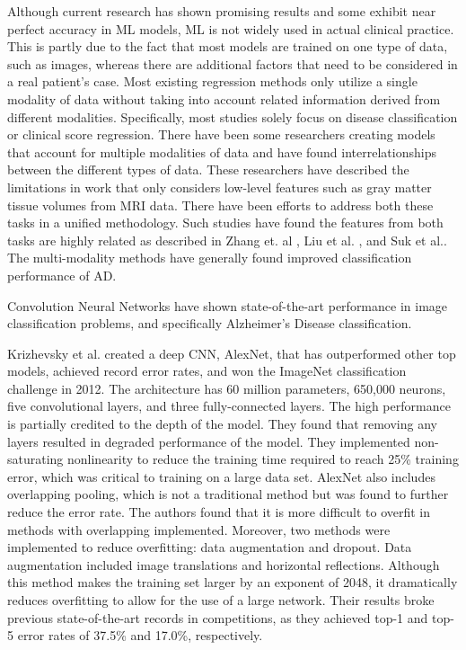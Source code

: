 \documentclass[10pt,twocolumn]{article}
\begin{document}
Although current research has shown promising results and some exhibit near perfect accuracy in ML models, ML is not widely used in actual clinical practice. This is partly due to the fact that most models are trained on one type of data, such as images, whereas there are additional factors that need to be considered in a real patient’s case. Most existing regression methods only utilize a single modality of data without taking into account related information derived from different modalities. Specifically, most studies solely focus on disease classification or clinical score regression. There have been some researchers creating models that account for multiple modalities of data and have found interrelationships between the different types of data. These researchers have described the limitations in work that only considers low-level features such as gray matter tissue volumes from MRI data. There have been efforts to address both these tasks in a unified methodology. Such studies have found the features from both tasks are highly related as described in Zhang et. al \cite{zhang2014classification}, Liu et al. \cite{liu2018joint}, and Suk et al.\cite{suk2013deep}. The multi-modality methods have generally found improved classification performance of AD. 

Convolution Neural Networks have shown state-of-the-art performance in image classification problems, and specifically Alzheimer's Disease classification. 

Krizhevsky et al.\cite{krizhevsky2012imagenet} 
created a deep CNN, AlexNet, that has outperformed other top models, achieved record error rates, and won the ImageNet classification challenge in 2012. The architecture has 60 million parameters,  650,000 neurons, five convolutional layers, and three fully-connected layers. The high performance is partially credited to the depth of the model. They found that removing any layers resulted in degraded performance of the model. They implemented non-saturating nonlinearity to reduce the training time required to reach 25\% training error, which was critical to training on a large data set.  AlexNet also includes overlapping pooling, which is not a traditional method but was found to further reduce the error rate. The authors found that it is more difficult to overfit in methods with overlapping implemented. Moreover, two methods were implemented to reduce overfitting: data augmentation and dropout. Data augmentation included image translations and horizontal reflections. Although this method makes the training set larger by an exponent of 2048, it dramatically reduces overfitting to allow for the use of a large network. Their results broke previous state-of-the-art records in competitions, as they achieved top-1 and top-5 error rates of 37.5\% and 17.0\%, respectively. 
\end{document}
